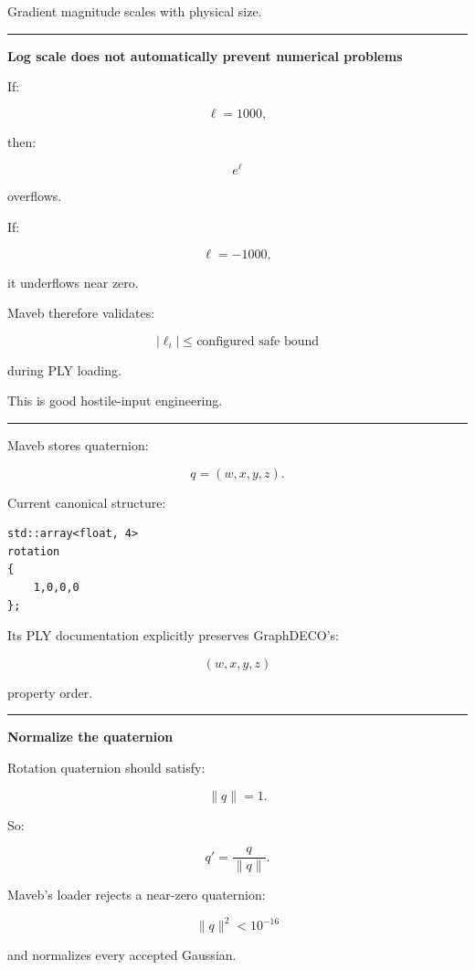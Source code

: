 Gradient magnitude scales with physical size.

\begin{center}\rule{0.5\linewidth}{0.5pt}\end{center}

\textbf{Log scale does not automatically prevent numerical problems}

If:

\[
\ell=1000,
\]

then:

\[
e^\ell
\]

overflows.

If:

\[
\ell=-1000,
\]

it underflows near zero.

Maveb therefore validates:

\[
|\ell_i|
\le
\text{configured safe bound}
\]

during PLY loading.

This is good hostile-input engineering.

\begin{center}\rule{0.5\linewidth}{0.5pt}\end{center}

Maveb stores quaternion:

\[
q=(w,x,y,z).
\]

Current canonical structure:

\begin{verbatim}
std::array<float, 4>
rotation
{
    1,0,0,0
};
\end{verbatim}

Its PLY documentation explicitly preserves GraphDECO's:

\[
(w,x,y,z)
\]

property order.

\begin{center}\rule{0.5\linewidth}{0.5pt}\end{center}

\textbf{Normalize the quaternion}

Rotation quaternion should satisfy:

\[
\|q\|=1.
\]

So:

\[
q'
=
\frac{q}{\|q\|}.
\]

Maveb's loader rejects a near-zero quaternion:

\[
\|q\|^2<10^{-16}
\]

and normalizes every accepted Gaussian.

